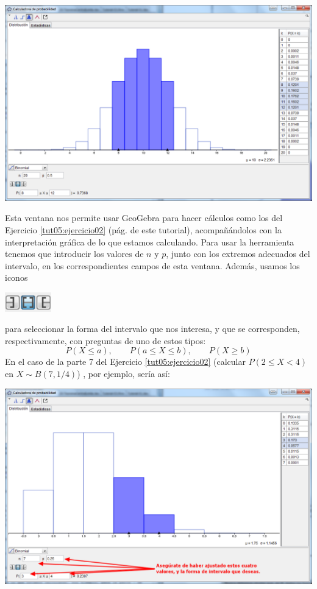 \documentclass[10pt,a4paper]{article}\usepackage[]{graphicx}\usepackage[]{color}
\begin{document}
\begin{center}
    \includegraphics[width=14cm]{../fig/Tut05-24.png}
\end{center}
Esta ventana nos permite usar GeoGebra para hacer cálculos como los del Ejercicio \ref{tut05:ejercicio02} (pág. \pageref{tut05:ejercicio02} de este tutorial), acompañándolos con la interpretación gráfica de lo que estamos calculando. Para usar la herramienta tenemos que introducir los valores de $n$ y $p$, junto con los extremos adecuados del intervalo, en los correspondientes campos de esta ventana. Además, usamos los iconos \begin{center}
\includegraphics[width=2cm]{../fig/Tut05-26.png}
\end{center}
para seleccionar la forma del intervalo que nos interesa,  y que se corresponden, respectivamente, con preguntas de uno de estos tipos:
\[
P(X\leq a),\qquad  P(a\leq X\leq b),\qquad P(X\geq b)
\]
En el caso de la parte 7 del Ejercicio \ref{tut05:ejercicio02} (calcular $P(2\leq X< 4)$ en $X\sim B(7, 1/4)$) , por ejemplo, sería así:
\begin{center}
    \includegraphics[width=15cm]{../fig/Tut05-25.png}
\end{center}
\end{document}
